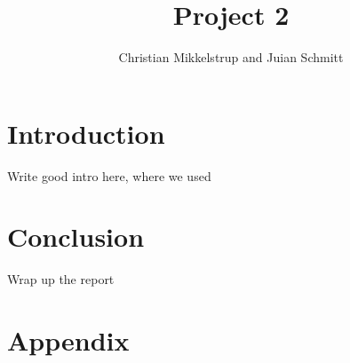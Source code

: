 \documentclass[12pt,a4paper]{article}
\title{Project 2}
\author{Christian Mikkelstrup and Juian Schmitt}
\begin{document}
\maketitle

\section{Introduction}
Write good intro here, where we used \cite{golub2013a}
\section{Conclusion}
Wrap up the report


\newpage
\section{Appendix}\label{sec:appendix}
\end{document}
